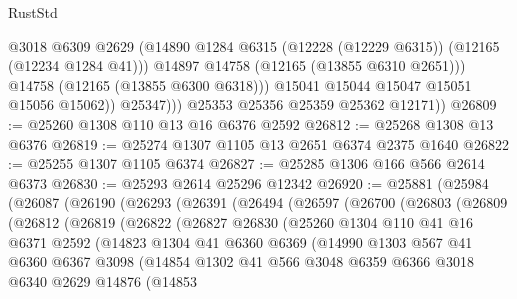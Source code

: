 \begin{lexlean}{RustStd}
\begin{coremodule}
                      @3018
                      @6309
                      @2629
                      (@14890 @1284 @6315 (@12228 (@12229 @6315)) (@12165 (@12234 @1284 @41)))
                      @14897
                      @14758
                      (@12165 (@13855 @6310 @2651)))
                    @14758
                    (@12165 (@13855 @6300 @6318)))
                  @15041
                  @15044
                  @15047
                  @15051
                  @15056
                  @15062))
              @25347)))
        @25353
        @25356
        @25359
        @25362
        @12171))
@26809 := @25260 @1308 @110 @13 @16 @6376 @2592
@26812 := @25268 @1308 @13 @6376
@26819 := @25274 @1307 @1105 @13 @2651 @6374 @2375 @1640
@26822 := @25255 @1307 @1105 @6374
@26827 := @25285 @1306 @166 @566 @2614 @6373
@26830 := @25293 @2614 @25296 @12342
@26920 := @25881
    (@25984
      (@26087
        (@26190
          (@26293
            (@26391
              (@26494
                (@26597
                  (@26700
                    (@26803
                      (@26809
                        (@26812
                          (@26819
                            (@26822
                              (@26827
                                @26830
                                (@25260
                                  @1304
                                  @110
                                  @41
                                  @16
                                  @6371
                                  @2592
                                  (@14823
                                    @1304
                                    @41
                                    @6360
                                    @6369
                                    (@14990
                                      @1303
                                      @567
                                      @41
                                      @6360
                                      @6367
                                      @3098
                                      (@14854
                                        @1302
                                        @41
                                        @566
                                        @3048
                                        @6359
                                        @6366
                                        @3018
                                        @6340
                                        @2629
                                        @14876
                                        (@14853

\end{coremodule}
\end{lexlean}
